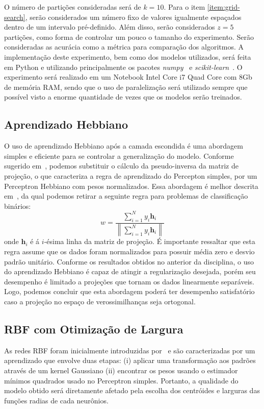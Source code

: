 \documentclass[conference]{IEEEtran}
\begin{document}
	O número de partições consideradas será de $k=10$. Para o item \ref{item:grid-search}, serão considerados um número fixo de valores igualmente espaçados dentro de um intervalo pré-definido. Além disso, serão considerados $z=5$ partições, como forma de controlar um pouco o tamanho do experimento. Serão consideradas as acurácia como a métrica para comparação dos algoritmos. A implementação deste experimento, bem como dos modelos utilizados, será feita em Python e utilizando principalmente os pacotes \textit{numpy}~\cite{harris2020array} e \textit{scikit-learn}~\cite{scikit-learn}. O experimento será realizado em um Notebook Intel Core i7 Quad Core com 8Gb de memória RAM, sendo que o uso de paralelização será utilizado sempre que possível visto a enorme quantidade de vezes que os modelos serão treinados.
	
	\subsection{Aprendizado Hebbiano}
	O uso de aprendizado Hebbiano após a camada escondida é uma abordagem simples e eficiente para se controlar a generalização do modelo. Conforme sugerido em~\cite{horta2015aplicaccao}, podemos substituir o cálculo da pseudo-inversa da matriz de projeção, o que caracteriza a regra de aprendizado do Percepton simples, por um Perceptron Hebbiano com pesos normalizados. Essa abordagem é melhor descrita em~\cite{fernandez2011direct}, da qual podemos retirar a seguinte regra para problemas de classificação binários:
	\begin{equation}
		w = \frac{ \sum^{N}_{i=1} y_i\textbf{h}_i}{\left\|  \sum^{N}_{i=1} y_i\textbf{h}_i \right\| }
	\end{equation}
	onde $\textbf{h}_i$ é á $i$-ésima linha da matriz de projeção. É importante ressaltar que esta regra assume que os dados foram normalizados para possuir média zero e desvio padrão unitário. Conforme os resultados obtidos no anterior da disciplina, o uso do aprendizado Hebbiano é capaz de atingir a regularização desejada, porém seu desempenho é limitado a projeções que tornam os dados linearmente separáveis. Logo, podemos concluir que esta abordagem poderá ter desempenho satisfatório caso a projeção no espaço de verossimilhanças seja ortogonal.
	
	\subsection{RBF com Otimização de Largura}
	As redes RBF foram inicialmente introduzidas por~\cite{broomhead1988multivariablefi} e são caracterizadas por um aprendizado que envolve duas etapas: (i) aplicar uma transformação aos padrões através de um kernel Gaussiano (ii) encontrar os pesos usando o estimador mínimos quadrados usado no Perceptron simples. Portanto, a qualidade do modelo obtido será diretamente afetado pela escolha dos centróides e larguras das funções radias de cada neurônios. 
	
\end{document}
